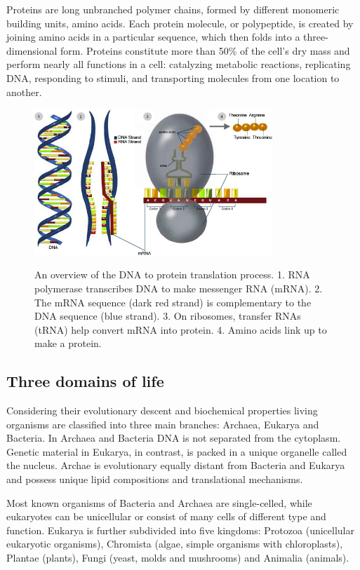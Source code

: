 \documentclass[11pt, a4paper,oneside]{report}
\begin{document}
Proteins are long unbranched polymer chains, formed by different monomeric building units, amino acids. Each protein molecule, or polypeptide, is created by joining amino acids in a particular sequence, which then folds into a three-dimensional form. Proteins constitute more than 50\%  of the cell's dry mass \cite{Alberts2007} and perform nearly all functions in a cell: catalyzing metabolic reactions, replicating DNA, responding to stimuli, and transporting molecules from one location to another.
\begin{figure}[t]
\begin{center}
\label{img:dnatoprotein}
\includegraphics[width=0.8\textwidth]{figures/dna_to_protein.jpg}
\end{center}
\caption{An overview of the DNA to protein translation process. 1. RNA polymerase transcribes DNA to make messenger RNA (mRNA). 2. The mRNA sequence (dark red strand) is complementary to the DNA sequence (blue strand). 3. On ribosomes, transfer RNAs (tRNA) help convert mRNA into protein. 4. Amino acids link up to make a protein.} 
\end{figure}

\subsection{Three domains of life}
Considering their evolutionary descent and biochemical properties living organisms are classified into three main branches: Archaea, Eukarya and Bacteria. In Archaea and Bacteria DNA is not separated from the cytoplasm. Genetic material in Eukarya, in contrast, is packed in a unique organelle called the nucleus. Archae is evolutionary equally distant from Bacteria and Eukarya and possess unique lipid compositions and translational mechanisms. 

Most known organisms of Bacteria and Archaea are single-celled, while eukaryotes can be unicellular or consist of many cells of different type and function. Eukarya is further subdivided into five kingdoms: Protozoa (unicellular eukaryotic organisms), Chromista (algae, simple organisms with chloroplasts), Plantae (plants), Fungi (yeast, molds and mushrooms) and Animalia (animals).    
\end{document}
